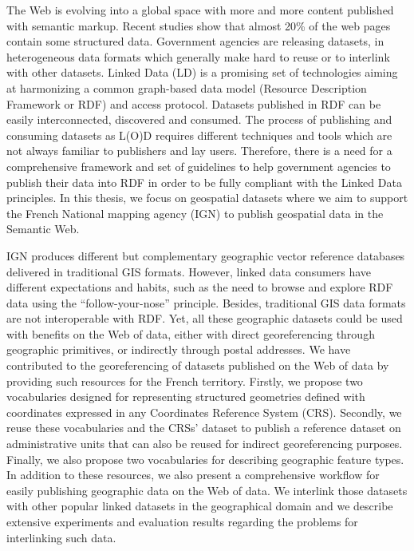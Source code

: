 The Web is evolving into a global space with more and more content published with semantic markup. Recent studies show that almost 20\% of the web pages contain some structured data. Government agencies are releasing datasets, in heterogeneous data formats which generally make hard to reuse or to interlink with other datasets. Linked Data (LD) is a promising set of technologies aiming at harmonizing a common graph-based data model (Resource Description Framework or RDF) and access protocol. Datasets published in RDF can be easily interconnected, discovered and consumed. The process of publishing and consuming datasets as L(O)D requires different techniques and tools which are not always familiar to publishers and lay users. Therefore, there is a need for a comprehensive framework and set of guidelines to help government agencies to publish their data into RDF in order to be fully compliant with the Linked Data principles. In this thesis, we focus on geospatial datasets where we aim to support the French National mapping agency (IGN) to publish geospatial data in the Semantic Web.

IGN produces different but complementary geographic vector reference databases delivered in traditional GIS formats. However, linked data consumers have different expectations and habits, such as the need to browse and explore RDF data using the ``follow-your-nose'' principle. Besides, traditional GIS data formats are not interoperable with RDF. Yet, all these geographic datasets could be used with benefits on the Web of data, either with direct georeferencing through geographic primitives, or indirectly through postal addresses. We have contributed to the georeferencing of datasets published on the Web of data by providing such resources for the French territory. Firstly, we propose two vocabularies designed for representing structured geometries defined with coordinates expressed in any Coordinates Reference System (CRS). Secondly, we reuse these vocabularies and the CRSs' dataset to publish a reference dataset on administrative units that can also be reused for indirect georeferencing purposes. Finally, we also propose two vocabularies for describing geographic feature types. In addition to these resources, we also present a comprehensive workflow for easily publishing geographic data on the Web of data. We interlink those datasets with other popular linked datasets in the geographical domain and we describe extensive experiments and evaluation results regarding the problems for interlinking such data.

